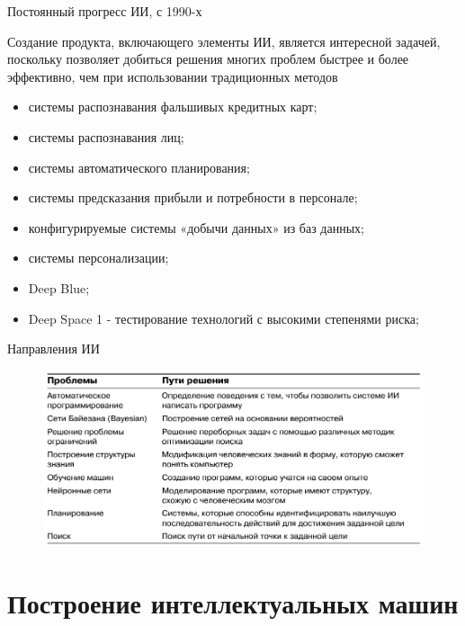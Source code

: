 \documentclass{beamer}
\begin{document}
\begin{frame}[t]
Постоянный прогресс ИИ, с 1990-х

Создание продукта, включающего элементы ИИ, является интересной задачей, поскольку позволяет добиться решения многих проблем быстрее и более эффективно, чем при использовании традиционных методов
\begin{itemize}
\item системы распознавания фальшивых кредитных карт;
\item системы распознавания лиц;
\item системы автоматического планирования;
\item системы предсказания прибыли и потребности в персонале;
\item конфигурируемые системы «добычи данных» из баз данных;
\item системы персонализации;
\item Deep Blue;
\item Deep Space 1 - тестирование технологий с высокими степенями риска;
\end{itemize}
\end{frame}

\begin{frame}[t]{Направления ИИ}
\begin{figure}[h]
\centering
\includegraphics[scale=0.45]{images/lec01-pic02.png}
\end{figure}
\end{frame}

\section{Построение интеллектуальных машин}
\end{document}
